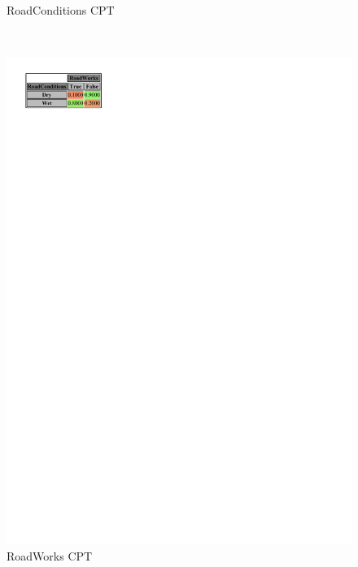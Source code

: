 \documentclass[a4paper,12pt]{article} %
\begin{document}
\begin{figure}[H]
\begin{minipage}[c]{.3\textwidth}
		\caption*{RoadConditions CPT}
		\label{fig:roadconditions}
	\end{minipage}
	~
	\begin{minipage}[c]{.3\textwidth}
		\centering
		
		\includegraphics[width=\linewidth]{../code/roadworks.pdf}	
		\caption*{RoadWorks CPT}
		\label{fig:roadworks}
	\end{minipage}
\end{figure}
\end{document}
